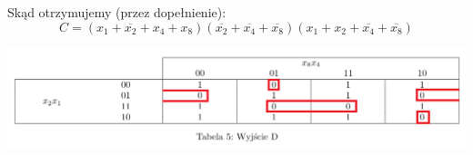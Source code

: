 \documentclass{article}
\begin{document}
                        
            \FloatBarrier
            Skąd otrzymujemy (przez dopełnienie):
            $$C = (x_1+\overline{x_2}+x_4+x_8)(\overline{x_2}+\overline{x_4}+\overline{x_8})(x_1+x_2+\overline{x_4}+\overline{x_8})$$
            \begin{center}
                \includegraphics[width=18cm]{reports/img/Z1C_tab_5.png}\\
            \end{center}
                        
                         
                        
\end{document}
